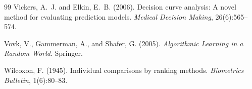 \documentclass[11pt,a4paper]{article}
\begin{document}
\begin{thebibliography}{99}
Vickers, A.~J. and Elkin, E.~B. (2006).
\newblock Decision curve analysis: A novel method for evaluating prediction models.
\newblock \textit{Medical Decision Making}, 26(6):565--574.

Vovk, V., Gammerman, A., and Shafer, G. (2005).
\newblock \textit{Algorithmic Learning in a Random World}.
\newblock Springer.

Wilcoxon, F. (1945).
\newblock Individual comparisons by ranking methods.
\newblock \textit{Biometrics Bulletin}, 1(6):80--83.

\end{thebibliography}
\end{document}

